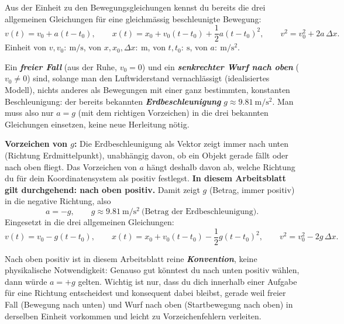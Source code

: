 \documentclass[addpoints,11pt,a4paper]{exam}
\begin{document}
\begin{theoriebox}
Aus der Einheit zu den Bewegungsgleichungen kennst du bereits die drei
allgemeinen Gleichungen für eine gleichmässig beschleunigte Bewegung:
\[
  v(t) = v_0 + a(t-t_0), \qquad
  x(t) = x_0 + v_0(t-t_0) + \frac{1}{2}a(t-t_0)^2, \qquad
  v^2 = v_0^2 + 2a\,\Delta x.
\]
Einheit von $v,v_0\colon\ \si{\meter\per\second}$, von
$x,x_0,\Delta x\colon\ \si{\meter}$, von $t,t_0\colon\ \si{\second}$, von
$a\colon\ \si{\meter\per\second\squared}$.

Ein \textbf{\emph{freier Fall}} (aus der Ruhe, $v_0=0$) und ein
\textbf{\emph{senkrechter Wurf nach oben}} ($v_0\neq0$) sind, solange man
den Luftwiderstand vernachlässigt (idealisiertes Modell), nichts anderes
als Bewegungen mit einer ganz bestimmten, konstanten Beschleunigung: der
bereits bekannten \textbf{\emph{Erdbeschleunigung}} $g\approx
\SI{9.81}{\meter\per\second\squared}$. Man muss also nur $a=g$ (mit dem
richtigen Vorzeichen) in die drei bekannten Gleichungen einsetzen, keine
neue Herleitung nötig.

\textbf{Vorzeichen von $g$:} Die Erdbeschleunigung als Vektor zeigt immer
nach unten (Richtung Erdmittelpunkt), unabhängig davon, ob ein Objekt
gerade fällt oder nach oben fliegt. Das Vorzeichen von $a$ hängt deshalb
davon ab, welche Richtung du für dein Koordinatensystem als positiv
festlegst. \textbf{In diesem Arbeitsblatt gilt durchgehend: nach oben
positiv.} Damit zeigt $g$ (Betrag, immer positiv) in die negative
Richtung, also
\[
  \boxed{a = -g}, \qquad g\approx\SI{9.81}{\meter\per\second\squared}\ \text{(Betrag der Erdbeschleunigung)}.
\]
Eingesetzt in die drei allgemeinen Gleichungen:
\[
  v(t) = v_0 - g(t-t_0), \qquad
  x(t) = x_0 + v_0(t-t_0) - \frac{1}{2}g(t-t_0)^2, \qquad
  v^2 = v_0^2 - 2g\,\Delta x.
\]
\end{theoriebox}

\begin{hinweisbox}
\glqq Nach oben positiv\grqq{} ist in diesem Arbeitsblatt reine
\textbf{\emph{Konvention}}, keine physikalische Notwendigkeit: Genauso
gut könntest du \glqq nach unten positiv\grqq{} wählen, dann würde $a=+g$
gelten. Wichtig ist nur, dass du dich innerhalb einer Aufgabe für eine
Richtung entscheidest und konsequent dabei bleibst, gerade weil freier
Fall (Bewegung nach unten) und Wurf nach oben (Startbewegung nach oben)
in derselben Einheit vorkommen und leicht zu Vorzeichenfehlern verleiten.
\end{hinweisbox}
\end{document}
